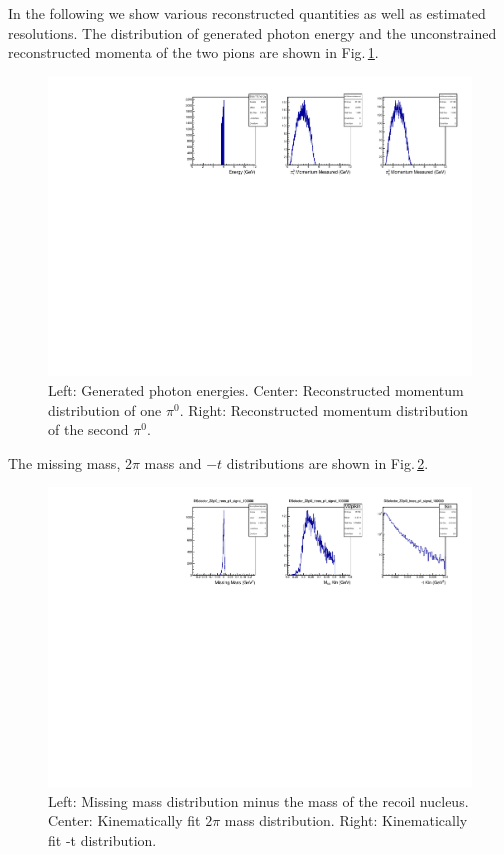 In the following we show various reconstructed quantities as well as
estimated resolutions. The distribution of generated photon energy and
the unconstrained reconstructed momenta of the two pions are shown in
Fig.\,\ref{fig:EgP1P2_signal_DSelector}.
\begin{figure}[tph]
\centering
\includegraphics[width=6in]{figures/EgP1P2_signal_DSelector.pdf}
\caption{Left: Generated photon energies. Center: Reconstructed momentum distribution of one $\pi^0$. Right: Reconstructed momentum distribution of the second $\pi^0$.
\label{fig:EgP1P2_signal_DSelector}}
\end{figure}
The missing mass, 2$\pi$ mass and $-t$ distributions are shown in Fig.\,\ref{fig:MMMpipit_signal_DSelector}.
\begin{figure}[tph]
\centering
\includegraphics[width=6in]{figures/MMMpipit_signal_DSelector.pdf}
\caption{Left: Missing mass distribution minus the mass of the recoil nucleus. Center: Kinematically fit $2\pi$ mass distribution. Right: Kinematically fit -t distribution.
\label{fig:MMMpipit_signal_DSelector}}
\end{figure}

